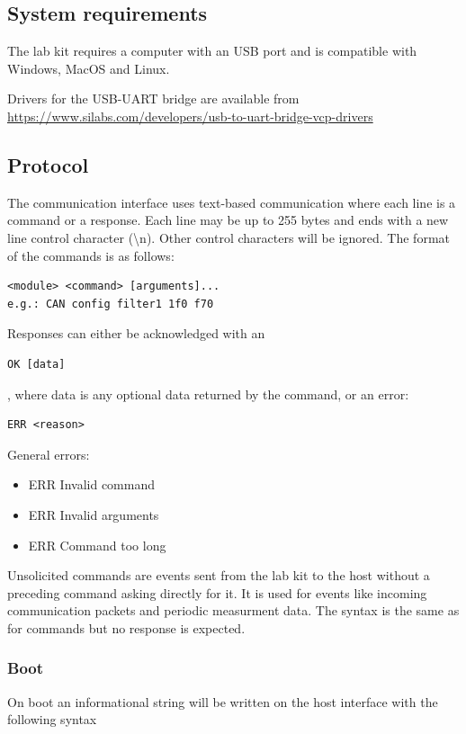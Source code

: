 \documentclass{article}[a4paper]
\begin{document}
\subsection{System requirements}

The lab kit requires a computer with an USB port and is compatible with Windows,
MacOS and Linux.

Drivers for the USB-UART bridge are available from
\url{https://www.silabs.com/developers/usb-to-uart-bridge-vcp-drivers}

\subsection{Protocol}

The communication interface uses text-based communication where each line is a
command or a response. Each line may be up to 255 bytes and ends with a new
line control character
(\textbackslash n). Other control characters will be ignored. The format of
the commands is as follows:
\begin{verbatim}
<module> <command> [arguments]...
e.g.: CAN config filter1 1f0 f70
\end{verbatim}

Responses can either be acknowledged with an
\begin{verbatim}
OK [data]
\end{verbatim}
, where data is any optional data returned by the command, or an error:
\begin{verbatim}
ERR <reason>
\end{verbatim}

General errors:
\begin{itemize}[noitemsep]
\item ERR Invalid command
\item ERR Invalid arguments
\item ERR Command too long
\end{itemize}

Unsolicited commands are events sent from the lab kit to the host without a
preceding command asking directly for it. It is used for events like incoming
communication packets and periodic measurment data. The syntax is the same as
for commands but no response is expected.

\subsubsection{Boot}
On boot an informational string will be written on the host interface with
the following syntax
\end{document}
